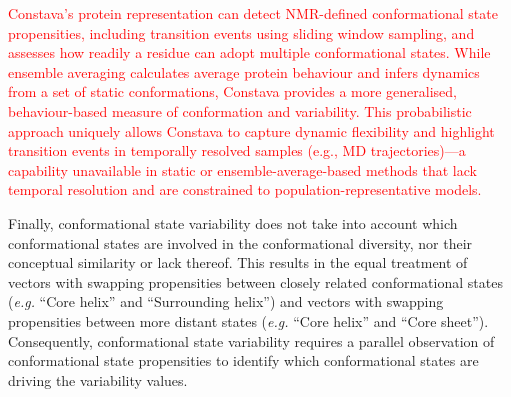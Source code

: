 
\textcolor{red}{Constava’s protein representation can detect NMR-defined conformational state propensities, including transition events using sliding window sampling, and assesses how readily a residue can adopt multiple conformational states. While ensemble averaging calculates average protein behaviour and infers dynamics from a set of static conformations, Constava provides a more generalised, behaviour-based measure of conformation and variability. This probabilistic approach uniquely allows Constava to capture dynamic flexibility and highlight transition events in temporally resolved samples (e.g., MD trajectories)---a capability unavailable in static or ensemble-average-based methods that lack temporal resolution and are constrained to population-representative models.}


Finally, conformational state variability does not take into account which conformational states are involved in the conformational diversity, nor their conceptual similarity or lack thereof. This results in the equal treatment of vectors with swapping propensities between closely related conformational states (\textit{e.g.} ``Core helix'' and ``Surrounding helix'') and vectors with swapping propensities between more distant states (\textit{e.g.} ``Core helix'' and ``Core sheet''). Consequently, conformational state variability requires a parallel observation of conformational state propensities to identify which conformational states are driving the variability values.




